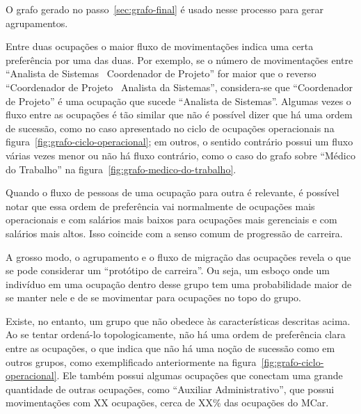\documentclass[12pt,a4paper]{article}
\theoremstyle{hypo}
\begin{document}

O grafo gerado no passo~\ref{sec:grafo-final} é usado nesse processo para gerar agrupamentos.

Entre duas ocupações o maior fluxo de movimentações indica uma certa preferência por uma das duas. Por exemplo, se o número de movimentações entre \enquote{Analista de Sistemas \textrightarrow~Coordenador de Projeto} for maior que o reverso \enquote{Coordenador de Projeto \textrightarrow~Analista da Sistemas}, considera-se que \enquote{Coordenador de Projeto} é uma ocupação que sucede \enquote{Analista de Sistemas}. Algumas vezes o fluxo entre as ocupações é tão similar que não é possível dizer que há uma ordem de sucessão, como no caso apresentado no ciclo de ocupações operacionais na figura~\ref{fig:grafo-ciclo-operacional}; em outros, o sentido contrário possui um fluxo várias vezes menor ou não há fluxo contrário, como o caso do grafo sobre \enquote{Médico do Trabalho} na figura~\ref{fig:grafo-medico-do-trabalho}.


Quando o fluxo de pessoas de uma ocupação para outra é relevante, é possível notar que essa ordem de preferência vai normalmente de ocupações mais operacionais e com salários mais baixos para ocupações mais gerenciais e com salários mais altos. Isso coincide com a senso comum de progressão de carreira.

A grosso modo, o agrupamento e o fluxo de migração das ocupações revela o que se pode considerar um \enquote{protótipo de carreira}. Ou seja, um esboço onde um indivíduo em uma ocupação dentro desse grupo tem uma probabilidade maior de se manter nele e de se movimentar para ocupações no topo do grupo.

Existe, no entanto, um grupo que não obedece às características descritas acima. Ao se tentar ordená-lo topologicamente, não há uma ordem de preferência clara entre as ocupações, o que indica que não há uma noção de sucessão como em outros grupos, como exemplificado anteriormente na figura~\ref{fig:grafo-ciclo-operacional}. Ele também possui algumas ocupações que conectam uma grande quantidade de outras ocupações, como \enquote{Auxiliar Administrativo}, que possui movimentações com XX ocupações, cerca de XX\% das ocupações do MCar.
\end{document}
